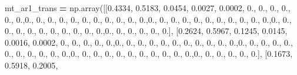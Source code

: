\documentclass[
]{book}
\newenvironment{Shaded}{\begin{snugshade}}{\end{snugshade}}
\newcommand{\FloatTok}[1]{\textcolor[rgb]{0.00,0.00,0.81}{#1}}
\newcommand{\NormalTok}[1]{#1}
\newcommand{\OperatorTok}[1]{\textcolor[rgb]{0.81,0.36,0.00}{\textbf{#1}}}
\begin{document}
\begin{Shaded}
\begin{Highlighting}[]
\NormalTok{mt\_ar1\_trans }\OperatorTok{=}\NormalTok{ np.array([[}\FloatTok{0.4334}\NormalTok{, }\FloatTok{0.5183}\NormalTok{, }\FloatTok{0.0454}\NormalTok{, }\FloatTok{0.0027}\NormalTok{, }\FloatTok{0.0002}\NormalTok{, }\FloatTok{0.}\NormalTok{, }\FloatTok{0.}\NormalTok{, }\FloatTok{0.}\NormalTok{, }\FloatTok{0.}\NormalTok{, }\FloatTok{0.}\NormalTok{, }\FloatTok{0.}\NormalTok{,}\FloatTok{0.}\NormalTok{,}
\FloatTok{0.}\NormalTok{, }\FloatTok{0.}\NormalTok{, }\FloatTok{0.}\NormalTok{, }\FloatTok{0.}\NormalTok{, }\FloatTok{0.}\NormalTok{, }\FloatTok{0.}\NormalTok{, }\FloatTok{0.}\NormalTok{, }\FloatTok{0.}\NormalTok{, }\FloatTok{0.}\NormalTok{, }\FloatTok{0.}\NormalTok{,}\FloatTok{0.}\NormalTok{, }\FloatTok{0.}\NormalTok{, }\FloatTok{0.}\NormalTok{, }\FloatTok{0.}\NormalTok{, }\FloatTok{0.}\NormalTok{, }\FloatTok{0.}\NormalTok{, }\FloatTok{0.}\NormalTok{, }\FloatTok{0.}\NormalTok{, }\FloatTok{0.}\NormalTok{, }\FloatTok{0.}\NormalTok{,}
\FloatTok{0.}\NormalTok{,}\FloatTok{0.}\NormalTok{, }\FloatTok{0.}\NormalTok{, }\FloatTok{0.}\NormalTok{, }\FloatTok{0.}\NormalTok{, }\FloatTok{0.}\NormalTok{, }\FloatTok{0.}\NormalTok{, }\FloatTok{0.}\NormalTok{, }\FloatTok{0.}\NormalTok{, }\FloatTok{0.}\NormalTok{, }\FloatTok{0.}\NormalTok{, }\FloatTok{0.}\NormalTok{,}\FloatTok{0.}\NormalTok{, }\FloatTok{0.}\NormalTok{, }\FloatTok{0.}\NormalTok{, }\FloatTok{0.}\NormalTok{, }\FloatTok{0.}\NormalTok{, }\FloatTok{0.}\NormalTok{], [}\FloatTok{0.2624}\NormalTok{,}
\FloatTok{0.5967}\NormalTok{, }\FloatTok{0.1245}\NormalTok{, }\FloatTok{0.0145}\NormalTok{, }\FloatTok{0.0016}\NormalTok{, }\FloatTok{0.0002}\NormalTok{, }\FloatTok{0.}\NormalTok{, }\FloatTok{0.}\NormalTok{, }\FloatTok{0.}\NormalTok{, }\FloatTok{0.}\NormalTok{, }\FloatTok{0.}\NormalTok{,}\FloatTok{0.}\NormalTok{, }\FloatTok{0.}\NormalTok{, }\FloatTok{0.}\NormalTok{, }\FloatTok{0.}\NormalTok{, }\FloatTok{0.}\NormalTok{,}
\FloatTok{0.}\NormalTok{, }\FloatTok{0.}\NormalTok{, }\FloatTok{0.}\NormalTok{, }\FloatTok{0.}\NormalTok{, }\FloatTok{0.}\NormalTok{, }\FloatTok{0.}\NormalTok{,}\FloatTok{0.}\NormalTok{, }\FloatTok{0.}\NormalTok{, }\FloatTok{0.}\NormalTok{, }\FloatTok{0.}\NormalTok{, }\FloatTok{0.}\NormalTok{, }\FloatTok{0.}\NormalTok{, }\FloatTok{0.}\NormalTok{, }\FloatTok{0.}\NormalTok{, }\FloatTok{0.}\NormalTok{, }\FloatTok{0.}\NormalTok{, }\FloatTok{0.}\NormalTok{,}\FloatTok{0.}\NormalTok{, }\FloatTok{0.}\NormalTok{, }\FloatTok{0.}\NormalTok{,}
\FloatTok{0.}\NormalTok{, }\FloatTok{0.}\NormalTok{, }\FloatTok{0.}\NormalTok{, }\FloatTok{0.}\NormalTok{, }\FloatTok{0.}\NormalTok{, }\FloatTok{0.}\NormalTok{, }\FloatTok{0.}\NormalTok{, }\FloatTok{0.}\NormalTok{,}\FloatTok{0.}\NormalTok{, }\FloatTok{0.}\NormalTok{, }\FloatTok{0.}\NormalTok{, }\FloatTok{0.}\NormalTok{, }\FloatTok{0.}\NormalTok{, }\FloatTok{0.}\NormalTok{], [}\FloatTok{0.1673}\NormalTok{, }\FloatTok{0.5918}\NormalTok{, }\FloatTok{0.2005}\NormalTok{,}

\end{Highlighting}
\end{Shaded}
\end{document}
